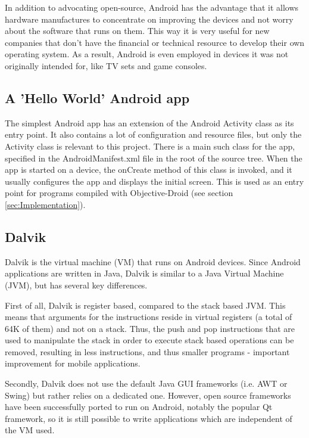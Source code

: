 \documentclass[parskip]{cs4rep}
\begin{document}
In addition to advocating open-source, Android has the advantage that it allows hardware manufactures to concentrate on improving the devices and not worry about the software that runs on them. This way it is very useful for new companies that don't have the financial or technical resource to develop their own operating system. As a result, Android is even employed in devices it was not originally intended for, like TV sets and game consoles\cite{Telecompaper2012}\cite{Etherington2013}.

\subsection{A 'Hello World' Android app} \label{sec:AndroidHelloWorld}

The simplest Android app has an extension of the Android Activity class as its entry point. It also contains a lot of configuration and resource files, but only the Activity class is relevant to this project. There is a main such class for the app, specified in the AndroidManifest.xml file in the root of the source tree. When the app is started on a device, the onCreate method of this class is invoked, and it usually configures the app and displays the initial screen. This is used as an entry point for programs compiled with Objective-Droid (see section \ref{sec:Implementation}).

\subsection{Dalvik}

Dalvik is the virtual machine (VM) that runs on Android devices. Since Android applications are written in Java, Dalvik is similar to a Java Virtual Machine (JVM), but has several key differences.

First of all, Dalvik is register based, compared to the stack based JVM. This means that arguments for the instructions reside in virtual registers (a total of 64K of them) and not on a stack. Thus, the push and pop instructions that are used to manipulate the stack in order to execute stack based operations can be removed, resulting in less instructions, and thus smaller programs - important improvement for mobile applications.

Secondly, Dalvik does not use the default Java GUI frameworks (i.e. AWT or Swing) but rather relies on a dedicated one. However, open source frameworks have been successfully ported to run on Android, notably the popular Qt framework, so it is still possible to write applications which are independent of the VM  used.
\end{document}
